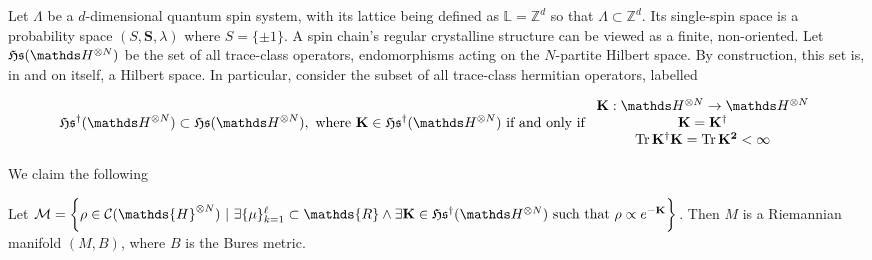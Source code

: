 \documentclass{homework}
\begin{document}
Let $\Lambda$ be a $d$-dimensional quantum spin system, with its lattice being defined as $\mathds{L} = \mathds{Z}^d$ so that $\Lambda \subset \mathds{Z}^d$. Its single-spin space is a probability space $(S, {\bm S}, \lambda)$ where $S = \{\pm 1\}$. A spin chain's regular crystalline structure can be viewed as a finite, non-oriented. Let $\mathfrak{H}\mathfrak{s}(\hilbert^{\otimes N})$ be the set of all trace-class operators, endomorphisms acting on the $N$-partite Hilbert space. By construction, this set is, in and on itself, a Hilbert space. In particular, consider the subset of all trace-class hermitian operators, labelled 

\begin{equation}
    \mathfrak{H}\mathfrak{s}^{\dagger}(\hilbert^{\otimes N}) \subset \mathfrak{H}\mathfrak{s}(\hilbert^{\otimes N}), \textnormal{ where } {\bf K} \in \mathfrak{H}\mathfrak{s}^{\dagger}(\hilbert^{\otimes N}) \textnormal{ if and only if } \begin{array}{c}
         {\bf K}: \hilbert^{\otimes N} \rightarrow \hilbert^{\otimes N} \\
         {\bf K} = \bf K^\dagger  \\
         \Tr \bf K^\dagger {\bf K} = \Tr \bf K^2 < \infty 
    \end{array}
\end{equation}

We claim the following

\begin{theo}
     Let $\mathcal{M} = \bigg\{ \rho \in \mathcal{C}(\mathds{H}^{\otimes N}) \blanky | \blanky \exists \{\mu\}_{k=1}^{\ell} \subset \mathds{R} \land \exists {\bf K} \in \mathfrak{H}\mathfrak{s}^{\dagger}(\hilbert^{\otimes N}) \textnormal{ such that } \rho \propto e^{-{\bf K}} \bigg\}$. Then $M$ is a Riemannian manifold $(M, B)$, where $B$ is the Bures metric. 

\end{theo}
\end{document}
